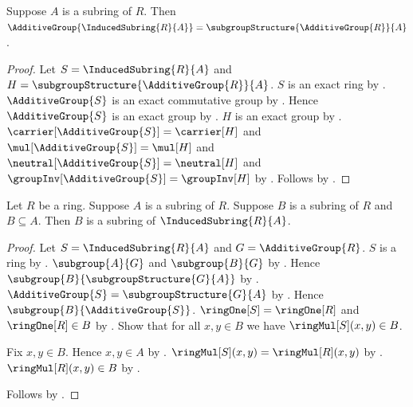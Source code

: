 \begin{theorem}\label{induced_subring_additive_group}
    Suppose $A$ is a subring of $R$.
    Then $\AdditiveGroup{\InducedSubring{R}{A}}
        =\subgroupStructure{\AdditiveGroup{R}}{A}$.
\end{theorem}
\begin{proof}
    Let $S=\InducedSubring{R}{A}$ and
        $H=\subgroupStructure{\AdditiveGroup{R}}{A}$.
    $S$ is an exact ring by .
    $\AdditiveGroup{S}$ is an exact commutative group by
        .
    Hence $\AdditiveGroup{S}$ is an exact group by
        .
    $H$ is an exact group by
        .
    $\carrier[\AdditiveGroup{S}]=\carrier[H]$ and
        $\mul[\AdditiveGroup{S}]=\mul[H]$ and
        $\neutral[\AdditiveGroup{S}]=\neutral[H]$ and
        $\groupInv[\AdditiveGroup{S}]=\groupInv[H]$ by
        .
    Follows by .
\end{proof}

\begin{theorem}\label{subring_of_induced_subring}
    Let $R$ be a ring.
    Suppose $A$ is a subring of $R$.
    Suppose $B$ is a subring of $R$ and $B\subseteq A$.
    Then $B$ is a subring of $\InducedSubring{R}{A}$.
\end{theorem}
\begin{proof}
    Let $S=\InducedSubring{R}{A}$ and $G=\AdditiveGroup{R}$.
    $S$ is a ring by .
    $\subgroup{A}{G}$ and $\subgroup{B}{G}$ by
        .
    Hence $\subgroup{B}{\subgroupStructure{G}{A}}$ by
        .
    $\AdditiveGroup{S}=\subgroupStructure{G}{A}$ by
        .
    Hence $\subgroup{B}{\AdditiveGroup{S}}$.
    $\ringOne[S]=\ringOne[R]$ and $\ringOne[R]\in B$ by
        .
    Show that for all $x,y\in B$ we have $\ringMul[S](x,y)\in B$.
    \begin{subproof}
        Fix $x,y\in B$.
        Hence $x,y\in A$ by .
        $\ringMul[S](x,y)=\ringMul[R](x,y)$ by
            .
        $\ringMul[R](x,y)\in B$ by .
    \end{subproof}
    Follows by .
\end{proof}


